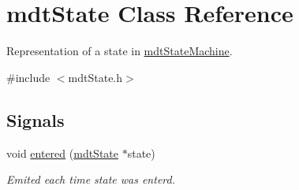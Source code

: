 \hypertarget{classmdt_state}{
\section{mdtState Class Reference}
\label{classmdt_state}
}


Representation of a state in \hyperlink{classmdt_state_machine}{mdtStateMachine}.  




{\ttfamily \#include $<$mdtState.h$>$}

\subsection*{Signals}
\begin{DoxyCompactItemize}
\item 
void \hyperlink{classmdt_state_af439b403568bc41b3db70e037bfd8456}{entered} (\hyperlink{classmdt_state}{mdtState} $\ast$state)
\begin{DoxyCompactList}\small\item\em Emited each time state was enterd. \end{DoxyCompactList}\end{DoxyCompactItemize}
